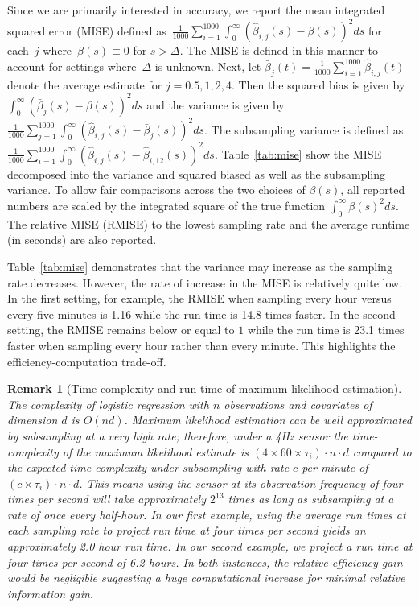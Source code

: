 \documentclass[12pt]{amsart}
\newtheorem{rmk}[thm]{Remark}%
\newenvironment{newmaterial}{\color{blue}}{\par}
\begin{document}
Since we are primarily interested in accuracy, we report the mean integrated squared error (MISE) defined as~$\frac{1}{1000} \sum_{i=1}^{1000} \int_{0}^{\infty} ( \hat \beta_{i,j} (s) - \beta(s))^2 ds$ for each~$j$ where~$\beta(s) \equiv 0$ for $s > \Delta$.  The MISE is defined in this manner to account for settings where~$\Delta$ is unknown.  Next, let $\bar \beta_{j} (t) = \frac{1}{1000} \sum_{i=1}^{1000} \hat \beta_{i,j} (t)$ denote the average estimate for $j=0.5,1,2,4$.  Then the squared bias is given by $\int_{0}^{\infty} ( \bar \beta_{j} (s) - \beta (s))^2 ds$ and the variance is given by $\frac{1}{1000} \sum_{j=1}^{1000} \int_{0}^{\infty} ( \hat \beta_{i,j} (s) - \bar \beta_j(s))^2 ds$.  The subsampling variance is defined as $\frac{1}{1000} \sum_{i=1}^{1000} \int_{0}^{\infty} ( \hat \beta_{i,j} (s) - \hat \beta_{i,12} (s))^2 ds$.  Table~\ref{tab:mise} show the MISE decomposed into the variance and squared biased as well as the subsampling variance.  To allow fair comparisons across the two choices of $\beta(s)$, all reported numbers are scaled by the integrated square of the true function $\int_{0}^{\infty} \beta(s)^2 ds$. The relative MISE (RMISE) to the lowest sampling rate and the average runtime (in seconds) are also reported.

Table~\ref{tab:mise} demonstrates that the variance may increase as the sampling rate decreases.  However, the rate of increase in the MISE is relatively quite low.  In the first setting, for example, the RMISE when sampling every hour versus every five minutes is 1.16 while the run time is 14.8 times faster.  In the second setting, the RMISE remains below or equal to $1$ while the run time is 23.1 times faster when sampling every hour rather than every minute.  This highlights the efficiency-computation trade-off.

\begin{rmk}[Time-complexity and run-time of maximum likelihood estimation]
The complexity of logistic regression with $n$ observations and covariates of dimension $d$ is $O(nd)$.  Maximum likelihood estimation can be well approximated by subsampling at a very high rate; therefore, under a 4Hz sensor the time-complexity of the maximum likelihood estimate is $(4 \times 60 \times \tau_i) \cdot n \cdot d$ compared to the expected time-complexity under subsampling with rate $c$ per minute of $(c \times \tau_i) \cdot n \cdot d$.  This means using the sensor at its observation frequency of four times per second will take approximately $2^{13}$ times as long as subsampling at a rate of once every half-hour.  In our first example, using the average run times at each sampling rate to project run time at four times per second yields an approximately 2.0 hour run time.  In our second example, we project a run time at four times per second of 6.2 hours.  In both instances, the relative efficiency gain would be negligible suggesting a huge computational increase for minimal relative information gain.
\end{rmk}
\end{document}
